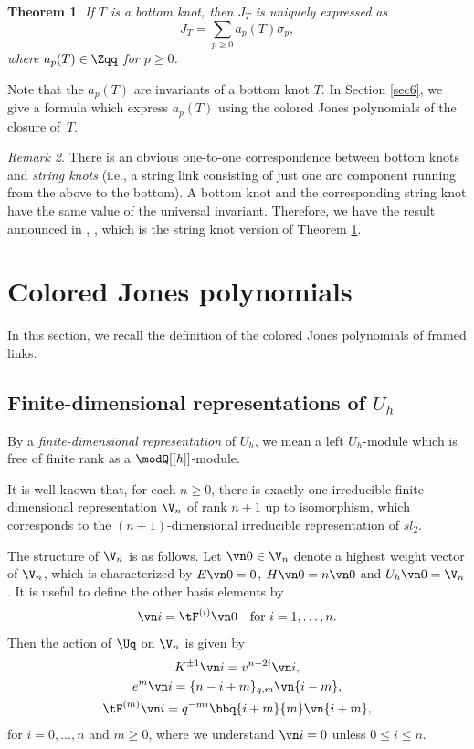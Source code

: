 \documentclass{amsart}
\numberwithin{equation}{section}
\numberwithin{figure}{section}
\theoremstyle{plain}
\newtheorem{theorem}{Theorem}[section]
\theoremstyle{definition}
\theoremstyle{remark}
\newtheorem{remark}[theorem]{Remark}
\begin{document}
\begin{theorem}
  \label{thm:23}
  If $T$ is a bottom knot, then $J_T$ is uniquely expressed as
  \begin{equation}
    \label{eq:74}
    J_T= \sum_{p\ge 0} a_p(T)\sigma _p,
  \end{equation}
  where $a_p(T)\in \Zqq$ for $p\ge 0$.
\end{theorem}

Note that the $a_p(T)$ are invariants of a bottom knot $T$.  In
Section \ref{sec6}, we give a formula which express $a_p(T)$ using the
colored Jones polynomials of the closure of~$T$.

\begin{remark}
  \label{r6}
  There is an obvious one-to-one correspondence between bottom knots
  and {\em string knots} (i.e., a string link consisting of just one
  arc component running from the above to the bottom).  A bottom knot
  and the corresponding string knot have the same value of the
  universal invariant.  Therefore, we have the result announced in
  \cite[Theorem 2.1]{H:rims2001}, \cite[Theorem 1.2]{H:uqsl2}, which
  is the string knot version of Theorem \ref{thm:23}.
\end{remark}

\section{Colored Jones polynomials}
\label{sec5}

In this section, we recall the definition of the colored Jones
polynomials of framed links.

\subsection{Finite-dimensional representations of $U_h$}
\label{sec:representations}
By a {\em finite-dimensional representation} of $U_h$, we mean a left
$U_h$-module which is free of finite rank as a $\modQ [[h]]$-module.

It is well known that, for each $n\ge 0$, there is exactly one
irreducible finite-dimensional representation $\V_n$ of rank $n+1$ up
to isomorphism, which corresponds to the $(n+1)$-dimensional
irreducible representation of $sl_2$.

The structure of $\V_n$ is as follows.  Let $\vn0\in \V_n$ denote a
highest weight vector of $\V_n$, which is characterized by $E\vn0=0$,
$H\vn0=n\vn0$ and $U_h\vn0=\V_n$.  It is useful to define the other
basis elements by
\begin{equation*}
  \vn i= \tF^{(i)}\vn0\quad \text{for $i=1,\ldots,n$}.
\end{equation*}
Then the action of $\Uq$ on $\V_n$ is given by
\begin{gather}
  K^{\pm 1} \vn i= v^{n-2i}\vn i,\\
  e^m \vn i= \{n-i+m\}_{q,m} \vn{i-m},\\
  \tF^{(m)} \vn i= q^{-mi}\bbq{i+m}{m}\vn{i+m},
\end{gather}
for $i=0,\ldots,n$ and $m\ge 0$, where we understand $\vn i=0$ unless
$0\le i\le n$.
\end{document}
